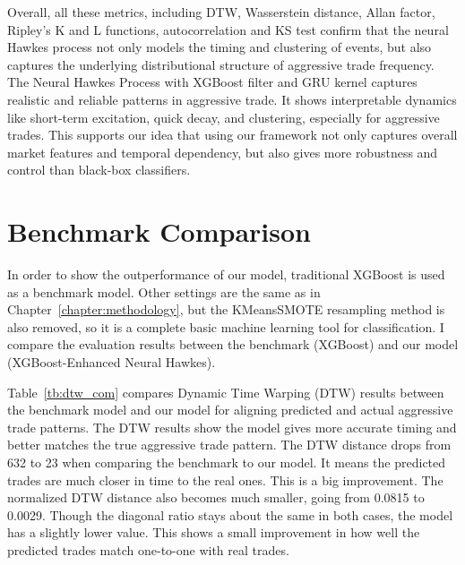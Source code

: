 

Overall, all these metrics, including DTW, Wasserstein distance, Allan factor, Ripley's K and L functions, autocorrelation and KS test confirm that the neural Hawkes process not only models the timing and clustering of events, but also captures the underlying distributional structure of aggressive trade frequency. The Neural Hawkes Process with XGBoost filter and GRU kernel captures realistic and reliable patterns in aggressive trade. It shows interpretable dynamics like short-term excitation, quick decay, and clustering, especially for aggressive trades. This supports our idea that using our framework not only captures overall market features and temporal dependency, but also gives more robustness and control than black-box classifiers.


\newpage

\section{Benchmark Comparison} \label{sec:benchmark}
In order to show the outperformance of our model, traditional XGBoost is used as a benchmark model. Other settings are the same as in Chapter~\ref{chapter:methodology}, but the KMeansSMOTE resampling method is also removed, so it is a complete basic machine learning tool for classification. I compare the evaluation results between the benchmark (XGBoost) and our model (XGBoost-Enhanced Neural Hawkes). 

Table~\ref{tb:dtw_com} compares Dynamic Time Warping (DTW) results between the benchmark model and our model for aligning predicted and actual aggressive trade patterns. The DTW results show the model gives more accurate timing and better matches the true aggressive trade pattern. The DTW distance drops from 632 to 23 when comparing the benchmark to our model. It means the predicted trades are much closer in time to the real ones. This is a big improvement. The normalized DTW distance also becomes much smaller, going from 0.0815 to 0.0029. Though the diagonal ratio stays about the same in both cases, the model has a slightly lower value. This shows a small improvement in how well the predicted trades match one-to-one with real trades.

